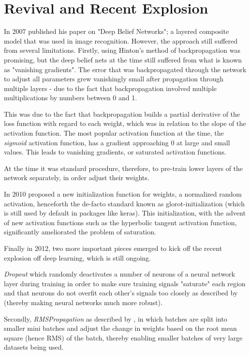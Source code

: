 \chapter{Revival and Recent Explosion}

In 2007 \cite{hinton2009deep} published his paper on "Deep Belief Networks"; a layered composite model that was used in image recognition. 
However, the approach still suffered from several limitations. Firstly, using Hinton's method of backpropagation was promising, but the deep belief nets at the time still suffered from what is known as "vanishing gradients". The error that was backpropagated through the network to adjust all parameters grew vanishingly small after propagation through multiple layers - due to the fact that backpropagation involved multiple multiplications by numbers between 0 and 1.

This was due to the fact that backpropagation builds a partial derivative of the loss function with regard to each weight, which was in relation to the slope of the activation function. The most popular activation function at the time, the \textit{sigmoid} activation function, has a gradient approaching 0 at large and small values. This leads to vanishing gradients, or saturated activation functions.

At the time it was standard procedure, therefore, to pre-train lower layers of the network separately, in order adjust their weights.

In 2010 \cite{glorot2010understanding} proposed a new initialization function for weights, a normalized random activation, henceforth the de-facto standard known as glorot-initialization (which is still used by default in packages like keras). This initialization, with the advent of new activation functions such as the hyperbolic tangent activation function, significantly ameliorated the problem of saturation.

Finally in 2012, two more important pieces emerged to kick off the recent explosion off deep learning, which is still ongoing. 

\textit{Dropout} which randomly deactivates a number of neurons of a neural network layer during training in order to make sure training signals "saturate" each region and that neurons do not overfit each other's signals too closely as described by \cite{dropout} (thereby making neural networks much more robust).

Secondly, \textit{RMSPropagation} as described by \cite{RMSPROP}, in which batches are split into smaller mini batches and adjust the change in weights based on the root mean square (hence RMS) of the batch, thereby enabling smaller batches of very large datasets being used. 


